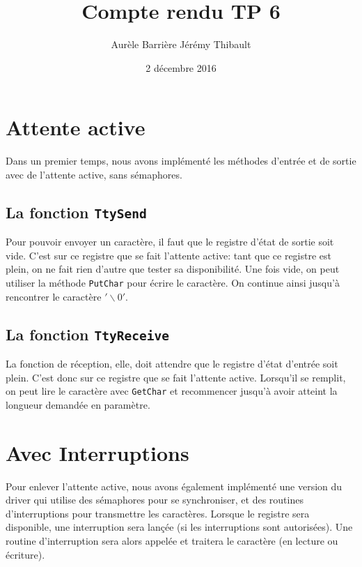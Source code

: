 \documentclass{article}
\title{Compte rendu TP 6}
\author{Aurèle Barrière \quad Jérémy Thibault}
\date{2 décembre 2016}
\def\fun#1{\texttt{#1}}
\def\zero{$'\backslash0'$}
\begin{document}
\maketitle

\section{Attente active}
Dans un premier temps, nous avons implémenté les méthodes d'entrée et de sortie avec de l'attente active, sans sémaphores.
\subsection{La fonction \fun{TtySend}}
Pour pouvoir envoyer un caractère, il faut que le registre d'état de sortie soit vide. C'est sur ce registre que se fait l'attente active: tant que ce registre est plein, on ne fait rien d'autre que tester sa disponibilité. Une fois vide, on peut utiliser la méthode \fun{PutChar} pour écrire le caractère. On continue ainsi jusqu'à rencontrer le caractère \zero.

\subsection{La fonction \fun{TtyReceive}}
La fonction de réception, elle, doit attendre que le registre d'état d'entrée soit plein. C'est donc sur ce registre que se fait l'attente active. Lorsqu'il se remplit, on peut lire le caractère avec \fun{GetChar} et recommencer jusqu'à avoir atteint la longueur demandée en paramètre.

\section{Avec Interruptions}
Pour enlever l'attente active, nous avons également implémenté une version du driver qui utilise des sémaphores pour se synchroniser, et des routines d'interruptions pour transmettre les caractères. Lorsque le registre sera disponible, une interruption sera lançée (si les interruptions sont autorisées). Une routine d'interruption sera alors appelée et traitera le caractère (en lecture ou écriture).
\end{document}
